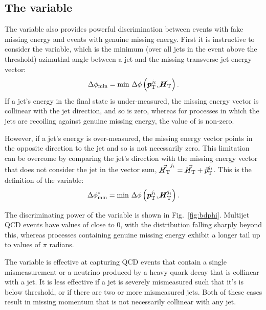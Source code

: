 \subsection{The \bdphi variable}

The \bdphi variable also provides powerful discrimination between events with 
fake missing energy and events with genuine missing energy.
First it is instructive to consider the \dphimin variable, which is the minimum 
(over all jets in the event above the \pt threshold) azimuthal angle between a 
jet and the missing transverse jet energy vector:
\begin{equation}
\Delta\phi_{\mathrm{min}} = \mathrm{min}~\Delta\phi\left(\bm{p}_{\mathrm 
T}^{j_i},\bm{\cancel{H}}_\mathrm{T}\right).
\end{equation}
If a jet's energy in the final state is under-measured, the missing energy 
vector is collinear with the jet direction, and so \dphimin is zero, whereas 
for processes in which the jets are recoiling against genuine missing energy, 
the value of \dphimin is non-zero.

However, if a jet's energy is over-measured, the missing energy vector points 
in the opposite direction to the jet and so \dphimin is not necessarily zero. 
This limitation can be overcome by comparing the jet's direction with the 
missing energy vector that does not consider the jet in the vector sum, 
$\vec{\mbox{$\cancel{H}_\text{T}$}}^{j_i} = \vec{\mbox{$\cancel{H}_\text{T}$}} + \vec{p}_{\mathrm T}^{j_i}$. This is the 
definition of the 
\bdphi variable:
\begin{equation}
\Delta\phi^{*}_{\mathrm{min}} = \mathrm{min}~\Delta\phi\left(\bm{p}_{\mathrm 
	T}^{j_i},\bm{\cancel{H}}_\mathrm{T}^{j_i}\right).
\end{equation}

The discriminating power of the \bdphi variable is shown in 
Fig.~\ref{fig:bdphi}. Multijet QCD events have values of \bdphi close to 0, 
with the distribution falling sharply beyond this, 
whereas processes containing genuine missing energy exhibit a longer tail up to 
values of $\pi$ radians.

The \bdphi variable is effective at capturing QCD events that contain a single 
mismeasurement or a neutrino produced by a heavy quark decay that is collinear 
with a jet. It is less effective if a jet is severely mismeasured such 
that it's \pt is below threshold, or if there are two or more mismeasured jets. 
Both of these cases result in missing momentum that is not necessarily 
collinear with any jet.

